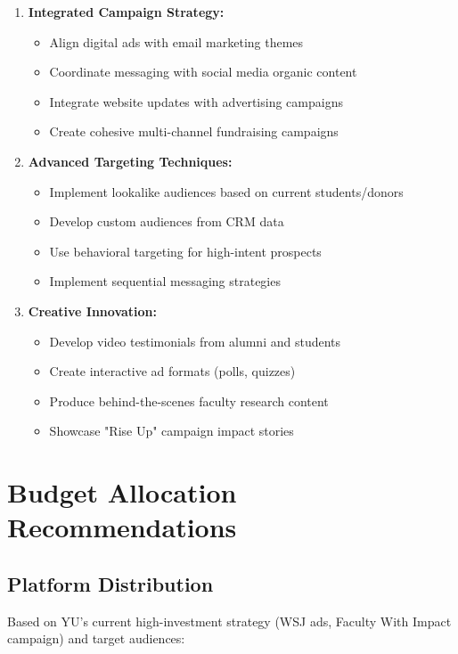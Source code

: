 \documentclass[12pt,letterpaper]{article}
\begin{document}
\begin{enumerate}[leftmargin=*]
    \item \textbf{Integrated Campaign Strategy:}
    \begin{itemize}
        \item Align digital ads with email marketing themes
        \item Coordinate messaging with social media organic content
        \item Integrate website updates with advertising campaigns
        \item Create cohesive multi-channel fundraising campaigns
    \end{itemize}

    \item \textbf{Advanced Targeting Techniques:}
    \begin{itemize}
        \item Implement lookalike audiences based on current students/donors
        \item Develop custom audiences from CRM data
        \item Use behavioral targeting for high-intent prospects
        \item Implement sequential messaging strategies
    \end{itemize}

    \item \textbf{Creative Innovation:}
    \begin{itemize}
        \item Develop video testimonials from alumni and students
        \item Create interactive ad formats (polls, quizzes)
        \item Produce behind-the-scenes faculty research content
        \item Showcase "Rise Up" campaign impact stories
    \end{itemize}
\end{enumerate}

\section{Budget Allocation Recommendations}

\subsection{Platform Distribution}

Based on YU's current high-investment strategy (WSJ ads, Faculty With Impact campaign) and target audiences:
\end{document}
